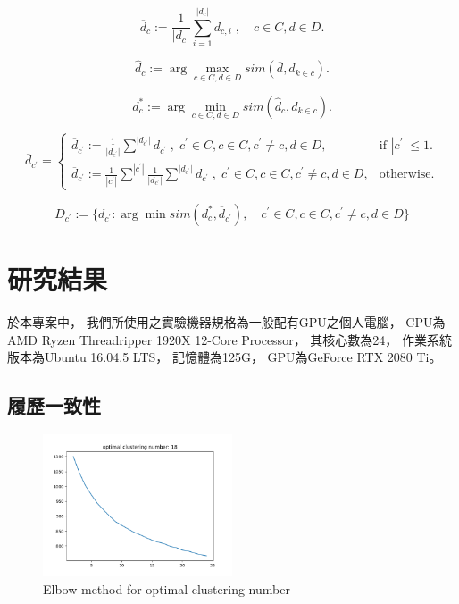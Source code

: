 \documentclass[acmsmall]{acmart}
\begin{document}
\begin{equation}
    \label{overline}
    \overline{d}_c := \frac{1}{|d_{c}|}\sum_{i=1}^{|d_{c}|}{d_{c,i}}\;, \quad c\in C, d\in D.
\end{equation}

\begin{equation}
    \label{d_hat}
    \hat{d}_c := \arg \max_{c\in C, d\in D} sim(\overline{d}, d_{k \in c}).
\end{equation}

\begin{equation}
    \label{d_star}
    d^{*}_c := \arg \min_{c\in C, d\in D} sim(\hat{d}_c, d_{k \in c}).
\end{equation}

\begin{equation}
    \label{eq:d_bar}
    \overline{d}_{c^{'}}=\begin{cases}
    \overline{d}_{c^{'}} := \frac{1}{|d_{c^{'}}|}\sum \limits_{}^{|d_{c^{'}}|}{d_{c^{'}}}\;, \; c^{'}\in C, c\in C, c^{'} \neq c, d\in D, & \text{if $|c^{'}| \leq 1$}.\\
    \overline{d}_{c^{'}} := \frac{1}{|c^{'}|} \sum \limits_{}^{|c^{'}|} \frac{1}{|d_{c^{'}}|}\sum \limits_{}^{|d_{c^{'}}|}{d_{c^{'}}}\;,\; c^{'}\in C, c\in C, c^{'} \neq c, d\in D, & \text{otherwise}.
  \end{cases}
\end{equation}

\begin{equation}
    \label{eq:c_dot}
    D_{c^{'}} := \{ d_{c^{'}}  : \arg \min sim(d^{*}_{c}, \overline{d}_{c^{'}}) , \quad c^{'}\in C, c\in C, c^{'} \neq c, d\in D \}
\end{equation}


\section{研究結果}

於本專案中，
我們所使用之實驗機器規格為一般配有GPU之個人電腦，
CPU為AMD Ryzen Threadripper 1920X 12-Core Processor，
其核心數為24，
作業系統版本為Ubuntu 16.04.5 LTS，
記憶體為125G，
GPU為GeForce RTX 2080 Ti。

\subsection{履歷一致性}

\begin{figure}
    \centerline{\includegraphics[width=0.5\textwidth]{elbow_method.png}}
    \caption{Elbow method for optimal clustering number}
    \label{elbow_method}
\end{figure}
\end{document}
